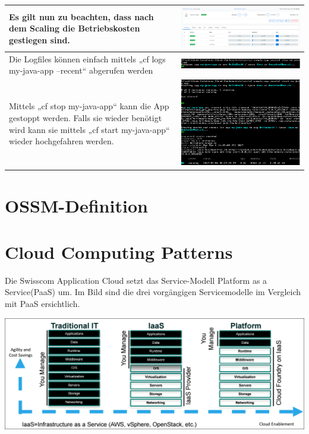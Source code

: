 \begin{longtable}{| p{5cm} | p{11cm} |}
Es gilt nun zu beachten, dass nach dem Scaling die Betriebskosten gestiegen sind. &\includegraphics[width=0.65\columnwidth, valign=T]{images/image18.png} \\ \hline
Die Logfiles können einfach mittels „cf logs my-java-app --recent“ abgerufen werden &\includegraphics[width=0.65\columnwidth, valign=T]{images/image19.png} \\ \hline
Mittels „cf stop my-java-app“ kann die App gestoppt werden. Falls sie wieder benötigt wird kann sie mittels „cf start my-java-app“ wieder hochgefahren werden. 
&\includegraphics[width=0.65\columnwidth, valign=T]{images/image20.png} \\ \hline
\end{longtable}

\chapter{OSSM-Definition}
\chapter{Cloud Computing Patterns}
Die Swisscom Application Cloud setzt das Service-Modell \glqq Platform as a Service\grqq (PaaS) um. Im Bild sind die drei vorgängigen Servicemodelle im Vergleich mit PaaS ersichtlich.
 
\includegraphics[scale=0.25]{images/power-of-platform.png}

